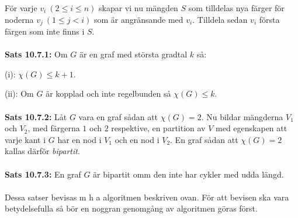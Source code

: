 \documentclass{article}
\begin{document}
För varje $v_i \ (2\leq i\leq n)$ skapar vi nu mängden $S$ som tilldelas nya färger för noderna $v_j \ (1\leq j<i)$ som är angränsande med $v_i$. Tilldela sedan $v_i$ första färgen som inte finns i $S$.\\ \\ 
\textbf{Sats 10.7.1:} Om $G$ är en graf med största gradtal $k$ så:

(i): $\chi(G)\leq k+1$.

(ii): Om $G$ är kopplad och inte regelbunden så $\chi(G)\leq k.$\\ \\
\textbf{Sats 10.7.2:} Låt $G$ vara en graf sådan att $\chi(G)=2$. Nu bildar mängderna $V_1$ och $V_2$, med färgerna $1$ och $2$ respektive, en partition av $V$ med egenskapen att varje kant i $G$ har en nod i $V_1$ och en nod i $V_2$. En graf sådan att $\chi(G)=2$ kallas därför \textit{bipartit}.\\ \\ 
\textbf{Sats 10.7.3:} En graf $G$ är bipartit omm den inte har cykler med udda längd.\\ \\ 
Dessa satser bevisas m h a algoritmen beskriven ovan. För att bevisen ska vara betydelsefulla så bör en noggran genomgång av algoritmen göras först.
\end{document}
